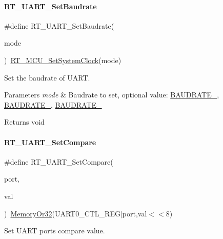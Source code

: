 \paragraph{\texorpdfstring{R\+T\+\_\+\+U\+A\+R\+T\+\_\+\+Set\+Baudrate}{RT\_UART\_SetBaudrate}}
{\footnotesize\ttfamily \#define R\+T\+\_\+\+U\+A\+R\+T\+\_\+\+Set\+Baudrate(\begin{DoxyParamCaption}\item[{}]{mode }\end{DoxyParamCaption})~\mbox{\hyperlink{a00020_a8e87aa8d85986723da69a68cd0d1e51c}{R\+T\+\_\+\+M\+C\+U\+\_\+\+Set\+System\+Clock}}(mode)}



Set the baudrate of U\+A\+RT. 


\begin{DoxyParams}{Parameters}
{\em mode} & Baudrate to set, optional value\+: \mbox{\hyperlink{a00056_a89d72bee69b33d0404d33f47608d16f0}{B\+A\+U\+D\+R\+A\+T\+E\+\_}}, \mbox{\hyperlink{a00056_ab94a89ecf1976f304764aec119e215e7}{B\+A\+U\+D\+R\+A\+T\+E\+\_}}, \mbox{\hyperlink{a00056_a9c74d2185a532185624b8dc3086f8e3e}{B\+A\+U\+D\+R\+A\+T\+E\+\_}} \\
\hline
\end{DoxyParams}
\begin{DoxyReturn}{Returns}
void 
\end{DoxyReturn}
\mbox{\label{a00056_a432520c6f67a10918aa07884250a7cbc}} 
\paragraph{\texorpdfstring{R\+T\+\_\+\+U\+A\+R\+T\+\_\+\+Set\+Compare}{RT\_UART\_SetCompare}}
{\footnotesize\ttfamily \#define R\+T\+\_\+\+U\+A\+R\+T\+\_\+\+Set\+Compare(\begin{DoxyParamCaption}\item[{}]{port,  }\item[{}]{val }\end{DoxyParamCaption})~\mbox{\hyperlink{a00020_a9ea92ebccdef6bdaca4d00210cc7266d}{Memory\+Or32}}(U\+A\+R\+T0\+\_\+\+C\+T\+L\+\_\+\+R\+EG$\vert$port,val$<$$<$8)}



Set U\+A\+RT port\textquotesingle{}s compare value. 


